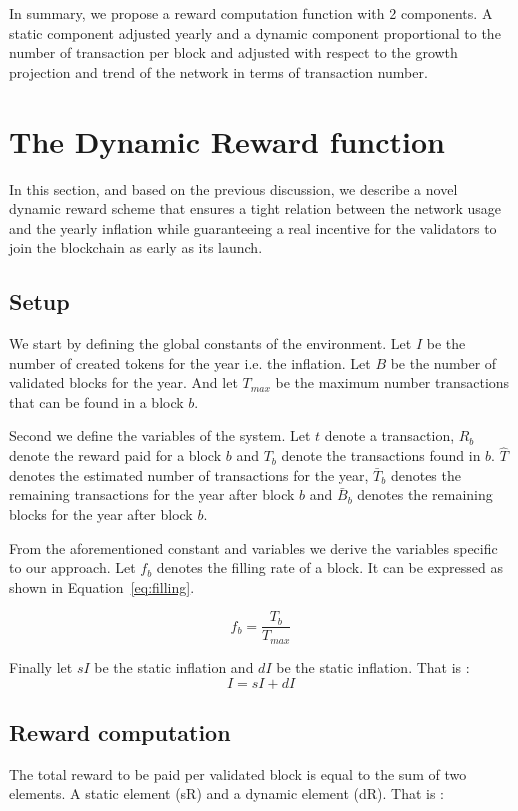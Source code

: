 \documentclass[conference]{IEEEtran}
\begin{document}
In summary, we propose a reward computation function with 2 components. A static component adjusted yearly and a dynamic component proportional to the number of transaction per block and adjusted with respect to the growth projection and trend of the network in terms of transaction number.

\section{The Dynamic Reward function}
\label{sec:scheme}
In this section, and based on the previous discussion, we describe  a novel dynamic reward scheme that ensures a tight relation between the network usage and the yearly inflation while guaranteeing a real incentive for the validators to join the blockchain as early as its launch.

\subsection{Setup}
\label{setup}
We start by defining the global constants of the environment. Let  $I$ be the number of created tokens for the year i.e. the inflation. Let $B$ be the number of validated blocks for the year. And let $T_{max}$ be the maximum number transactions that can be found in a block $b$.

Second we define the variables of the system. Let $t$ denote a transaction, $R_b$ denote the reward paid for a block $b$ and $T_b$ denote the transactions found in $b$. $\hat{T}$ denotes the estimated number of transactions for the year, $\bar{T}_b$ denotes the remaining transactions for the year after block $b$ and $\bar{B}_b$ denotes the remaining blocks for the year after block $b$.


From the aforementioned constant and variables we derive the variables specific to our approach. Let $f_b$ denotes the filling rate of a block. It can be expressed as shown in Equation~\ref{eq:filling}.

\begin{equation}
        f_b=\frac{T_b}{T_{max}}
        \label{eq:filling}
\end{equation}

Finally let $sI$ be the static inflation and $dI$ be the static inflation. That is :
\begin{equation}
    I=sI+dI
    \label{eq:inflationsplit}
\end{equation}


\subsection{Reward computation}
The total reward to be paid per validated block is equal to the sum of two elements. A static element (sR) and a dynamic element (dR). That is :
\end{document}
